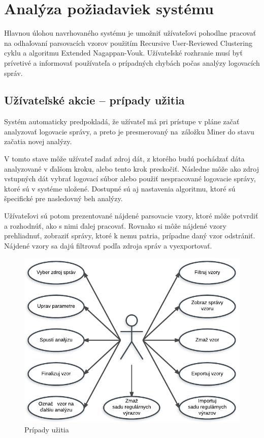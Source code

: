 \chapter{Analýza požiadaviek systému}

Hlavnou úlohou navrhovaného systému je umožniť užívateľovi pohodlne pracovať na odhaľovaní parsovacích vzorov použitím Recursive User-Reviewed Clustering cyklu a algoritmu Extended Nagappan-Vouk. Užívateľské rozhranie musí byť prívetivé a informovať používateľa o prípadných chybách počas analýzy logovacích správ.

\section{Užívateľské akcie -- prípady užitia}

Systém automaticky predpokladá, že užívateľ má pri prístupe v pláne začať analyzovať logovacie správy, a preto je presmerovaný na~záložku Miner do stavu začatia novej analýzy. 
\par V tomto stave môže užívateľ zadať zdroj dát, z ktorého budú pochádzať dáta analyzované v ďalšom kroku, alebo tento krok presko\-čiť. Následne môže ako zdroj vstupných dát vybrať logovací súbor alebo použiť nespracované logovacie správy, ktoré sú v systéme uložené. Dostupné sú aj nastavenia algoritmu, ktoré sú špecifické pre nasledovný beh analýzy. \par Užívateľovi sú potom prezentované nájdené parsovacie vzory, ktoré môže potvrdiť a rozhodnúť, ako s nimi ďalej pracovať. Rovnako si môže nájdené vzory prehliadnuť, zobraziť správy, ktoré k nemu patria, prípadne daný vzor odstrániť. Nájdené vzory sa dajú filtrovať podľa zdroja správ a vyexportovať.

\begin{figure}[htbp]
 \centering 
 \begin{minipage}{0.95\linewidth}
 	\centering
 	\includegraphics[width=\textwidth]{Images/thesis-use-cases.pdf}	
 \end{minipage}
  \caption{Prípady užitia}
  \label{fig:use-cases}
\end{figure}

